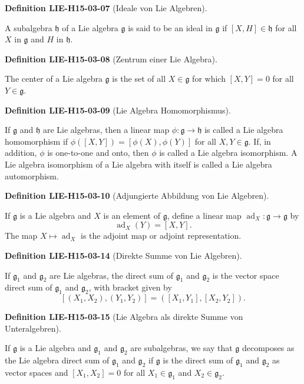 \documentclass[10pt, letterpaper]{article}
\newcommand{\CustomHeading}[3]{%
  \par\medskip\noindent%
  \textbf{#1 #2} \textnormal{(#3)}.\enskip%
}
\newenvironment{DEF}[2]{\CustomHeading{Definition}{#1}{#2}}{}
\begin{document}
\begin{DEF}{LIE-H15-03-07}{Ideale von Lie Algebren}
A subalgebra $\mathfrak{h}$ of a Lie algebra $\mathfrak{g}$ is said to be an ideal in $\mathfrak{g}$ if $[X, H] \in \mathfrak{h}$ for all $X$ in $\mathfrak{g}$ and $H$ in $\mathfrak{h}$.
\end{DEF}

\begin{DEF}{LIE-H15-03-08}{Zentrum einer Lie Algebra}
The center of a Lie algebra $\mathfrak{g}$ is the set of all $X \in \mathfrak{g}$ for which $[X, Y]=0$ for all $Y \in \mathfrak{g}$.
\end{DEF}

\begin{DEF}{LIE-H15-03-09}{Lie Algebra Homomorphismus}
If $\mathfrak{g}$ and $\mathfrak{h}$ are Lie algebras, then a linear map $\phi: \mathfrak{g} \rightarrow \mathfrak{h}$ is called a Lie algebra homomorphism if $\phi([X, Y])=[\phi(X), \phi(Y)]$ for all $X, Y \in \mathfrak{g}$. If, in addition, $\phi$ is one-to-one and onto, then $\phi$ is called a Lie algebra isomorphism. A Lie algebra isomorphism of a Lie algebra with itself is called a Lie algebra automorphism.
\end{DEF}

\begin{DEF}{LIE-H15-03-10}{Adjungierte Abbildung von Lie Algebren}
If $\mathfrak{g}$ is a Lie algebra and $X$ is an element of $\mathfrak{g}$, define a linear map $\operatorname{ad}_{X}: \mathfrak{g} \rightarrow \mathfrak{g}$ by
$$
\operatorname{ad}_{X}(Y)=[X, Y] .
$$
The map $X \mapsto \operatorname{ad}_{X}$ is the adjoint map or adjoint representation.
\end{DEF}

\begin{DEF}{LIE-H15-03-14}{Direkte Summe von Lie Algebren}
If $\mathfrak{g}_{1}$ and $\mathfrak{g}_{2}$ are Lie algebras, the direct sum of $\mathfrak{g}_{1}$ and $\mathfrak{g}_{2}$ is the vector space direct sum of $\mathfrak{g}_{1}$ and $\mathfrak{g}_{2}$, with bracket given by
$$
\left[\left(X_{1}, X_{2}\right),\left(Y_{1}, Y_{2}\right)\right]=\left(\left[X_{1}, Y_{1}\right],\left[X_{2}, Y_{2}\right]\right) .
$$
\end{DEF}

\begin{DEF}{LIE-H15-03-15}{Lie Algebra als direkte Summe von Unteralgebren}
If $\mathfrak{g}$ is a Lie algebra and $\mathfrak{g}_{1}$ and $\mathfrak{g}_{2}$ are subalgebras, we say that $\mathfrak{g}$ decomposes as the Lie algebra direct sum of $\mathfrak{g}_{1}$ and $\mathfrak{g}_{2}$ if $\mathfrak{g}$ is the direct sum of $\mathfrak{g}_{1}$ and $\mathfrak{g}_{2}$ as vector spaces and $\left[X_{1}, X_{2}\right]=0$ for all $X_{1} \in \mathfrak{g}_{1}$ and $X_{2} \in \mathfrak{g}_{2}$.
\end{DEF}
\end{document}
